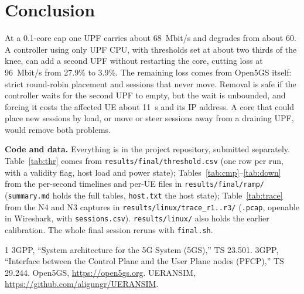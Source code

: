 \documentclass[conference]{IEEEtran}
\begin{document}
\section{Conclusion}
At a 0.1-core cap one UPF carries about 68~Mbit/s and degrades from about 60. A controller using only UPF CPU, with thresholds set at about two thirds of the knee, can add a second UPF without restarting the core, cutting loss at 96~Mbit/s from 27.9\% to 3.9\%. The remaining loss comes from Open5GS itself: strict round-robin placement and sessions that never move. Removal is safe if the controller waits for the second UPF to empty, but the wait is unbounded, and forcing it costs the affected UE about 11~s and its IP address. A core that could place new sessions by load, or move or steer sessions away from a draining UPF, would remove both problems.

\textbf{Code and data.} Everything is in the project repository, submitted separately. Table~\ref{tab:thr} comes from \texttt{results/final/threshold.csv} (one row per run, with a validity flag, host load and power state); Tables~\ref{tab:cmp}--\ref{tab:down} from the per-second timelines and per-UE files in \texttt{results/final/ramp/} (\texttt{summary.md} holds the full tables, \texttt{host.txt} the host state); Table~\ref{tab:trace} from the N4 and N3 captures in \texttt{results/linux/trace\_r1..r3/} (\texttt{.pcap}, openable in Wireshark, with \texttt{sessions.csv}). \texttt{results/linux/} also holds the earlier calibration. The whole final session reruns with \texttt{final.sh}.

\begin{thebibliography}{1}
 3GPP, ``System architecture for the 5G System (5GS),'' TS 23.501.
 3GPP, ``Interface between the Control Plane and the User Plane nodes (PFCP),'' TS 29.244.
 Open5GS, \url{https://open5gs.org}.
 UERANSIM, \url{https://github.com/aligungr/UERANSIM}.
\end{thebibliography}
\end{document}
